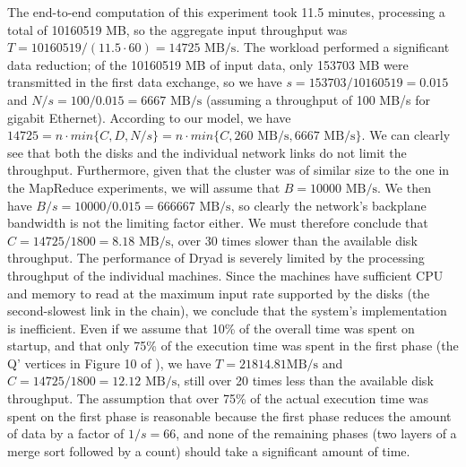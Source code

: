 \documentclass{acm_proc_article-sp}
\begin{document}
The end-to-end computation of this experiment took 11.5 minutes, processing a total of 10160519 MB, so the aggregate input throughput was $T = 10160519 / (11.5 \cdot 60) = 14725 \text{ MB/s}$. The workload performed a significant data reduction; of the 10160519 MB of input data, only 153703 MB were transmitted in the first data exchange, so we have $s = 153703 / 10160519 = 0.015$ and $N/s = 100/0.015 = 6667 \text{ MB/s}$ (assuming a throughput of 100 MB/s for gigabit Ethernet). According to our model, we have $14725 = n \cdot min\{C, D, N/s\} = n \cdot min\{C, 260 \text{ MB/s}, 6667 \text{ MB/s}\}$. We can clearly see that both the disks and the individual network links do not limit the throughput. Furthermore, given that the cluster was of similar size to the one in the MapReduce experiments, we will assume that $B = 10000 \text{ MB/s}$. We then have $B/s = 10000/0.015 = 666667 \text{ MB/s}$, so clearly the network's backplane bandwidth is not the limiting factor either. We must therefore conclude that $C = 14725 / 1800 = 8.18 \text{ MB/s}$, over 30 times slower than the available disk throughput. The performance of Dryad is severely limited by the processing throughput of the individual machines. Since the machines have sufficient CPU and memory to read at the maximum input rate supported by the disks (the second-slowest link in the chain), we conclude that the system's implementation is inefficient. Even if we assume that 10\% of the overall time was spent on startup, and that only 75\% of the execution time was spent in the first phase (the Q' vertices in Figure 10 of \cite{dryad}), we have $T = 21814.81 \text{MB/s}$ and $C = 14725 / 1800 = 12.12 \text{ MB/s}$, still over 20 times less than the available disk throughput. The assumption that over 75\% of the actual execution time was spent on the first phase is reasonable because the first phase reduces the amount of data by a factor of $1/s = 66$, and none of the remaining phases  (two layers of a merge sort followed by a count) should take a significant amount of time.




\balancecolumns
\end{document}
